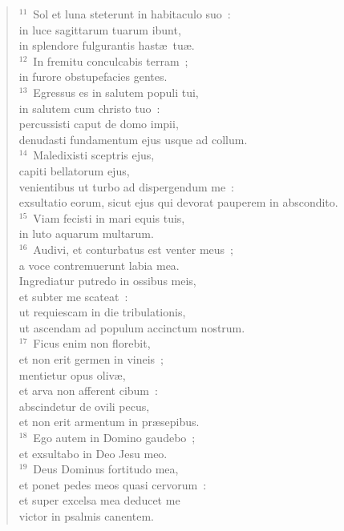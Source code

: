 \begin{verse}
${}^{11}$~Sol et luna steterunt in habitaculo suo~:\\ in luce sagittarum tuarum ibunt,\\ in splendore fulgurantis hast\ae\ tu\ae .\\
${}^{12}$~In fremitu conculcabis terram~;\\ in furore obstupefacies gentes.\\
${}^{13}$~Egressus es in salutem populi tui,\\ in salutem cum christo tuo~:\\ percussisti caput de domo impii,\\ denudasti fundamentum ejus usque ad collum.\\
${}^{14}$~Maledixisti sceptris ejus,\\ capiti bellatorum ejus,\\ venientibus ut turbo ad dispergendum me~:\\ exsultatio eorum, sicut ejus qui devorat pauperem in abscondito.\\
${}^{15}$~Viam fecisti in mari equis tuis,\\ in luto aquarum multarum.\\
${}^{16}$~Audivi, et conturbatus est venter meus~;\\ a voce contremuerunt labia mea.\\ Ingrediatur putredo in ossibus meis,\\ et subter me scateat~:\\ ut requiescam in die tribulationis,\\ ut ascendam ad populum accinctum nostrum.\\
${}^{17}$~Ficus enim non florebit,\\ et non erit germen in vineis~;\\ mentietur opus oliv\ae ,\\ et arva non afferent cibum~:\\ abscindetur de ovili pecus,\\ et non erit armentum in pr\ae sepibus.\\
${}^{18}$~Ego autem in Domino gaudebo~;\\ et exsultabo in Deo Jesu meo.\\
${}^{19}$~Deus Dominus fortitudo mea,\\ et ponet pedes meos quasi cervorum~:\\ et super excelsa mea deducet me\\ victor in psalmis canentem.\end{verse}


